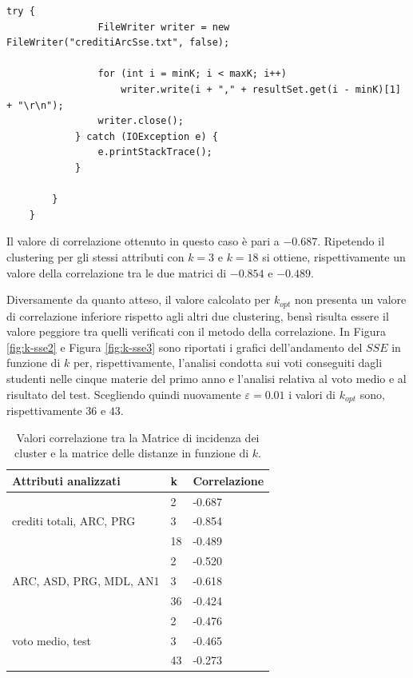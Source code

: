 \documentclass[12pt]{article}
\begin{document}
\begin{lstlisting}[caption={Codice Java per il calcolo di SSE al variare di K}, label={javasse}, captionpos=b, style = java]
			try {
				FileWriter writer = new FileWriter("creditiArcSse.txt", false);
	
				for (int i = minK; i < maxK; i++)
					writer.write(i + "," + resultSet.get(i - minK)[1] + "\r\n");
				writer.close();
			} catch (IOException e) {
				e.printStackTrace();
			}
	
		}
	}		
\end{lstlisting}
Il valore di correlazione ottenuto in questo caso è pari a $-0.687$.
Ripetendo il clustering per gli stessi attributi con $k=3$ e $k=18$ si ottiene, 
rispettivamente un valore della correlazione tra le due matrici di $-0.854$ e $-0.489$. 

Diversamente da quanto atteso, il valore calcolato per $k_{opt}$ non presenta un valore di correlazione 
inferiore rispetto agli altri due clustering, 
bensì risulta essere il valore peggiore tra quelli verificati con il metodo della correlazione. 
In Figura \ref{fig:k-sse2} e Figura \ref{fig:k-sse3} sono riportati i grafici dell'andamento 
del $SSE$ in funzione di $k$ per, rispettivamente, 
l'analisi condotta sui voti conseguiti dagli studenti nelle cinque materie del primo anno e l'analisi relativa al voto medio e al risultato del test. 
Scegliendo quindi nuovamente $\varepsilon=0.01$ i valori di $k_{opt}$ sono, rispettivamente $36$ e $43$. 

\begin{table}[H]
\centering
\begin{tabular}{@{}l|l|l@{}}
\hline
\textbf{Attributi analizzati}   							& \textbf{k} & \textbf{Correlazione} \\ \hline
                                							& 2          & -0.687                \\ \cline{2-3} 
crediti totali, ARC, PRG        							& 3          & -0.854                \\ \cline{2-3} 
                                							& 18         & -0.489                \\ \hline
                                							& 2          & -0.520                \\ \cline{2-3} 
ARC, ASD, PRG, MDL,	AN1	\hspace{3em}									& 3          & -0.618                \\ \cline{2-3} 
                                							& 36         & -0.424                \\ \hline
                                							& 2          & -0.476                \\ \cline{2-3} 
voto medio, test                							& 3          & -0.465                \\ \cline{2-3} 
                                							& 43         & -0.273                \\ \hline
\end{tabular}
\caption{Valori correlazione tra la Matrice di incidenza dei cluster e la matrice delle distanze in funzione di $k$.}
\label{tab:corr2}
\end{table}
\end{document}

